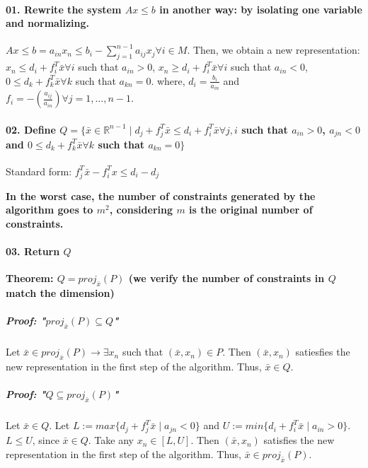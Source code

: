 \documentclass[main]{subfiles}
\begin{document}
\paragraph{01. Rewrite the system $Ax \leq b$ in another way: by isolating one
variable and normalizing.}

$Ax \leq b = a_{i n} x_{n} \leq b_i - \sum_{j = 1}^{n-1} a_{ij}x_j \forall i
\in M$.
Then, we obtain a new representation:
$x_n \leq d_i + f_i^T \bar{x} \forall i$ such that $a_{in} > 0$,
$x_n \geq d_i + f_i^T \bar{x} \forall i $ such that $a_{in} < 0$,
$0 \leq d_k + f_k^T \bar{x} \forall k $ such that $a_{kn} = 0$.
where, $d_i = \frac{b_i}{a_{in}}$ and $f_i = -(\frac{a_{ij}}{a_{in}}) \forall j
= 1, \dots, n-1$.

\paragraph{02. Define $Q = \{\bar{x} \in \mathbb{R}^{n-1} \mid d_j + f_j^T
\bar{x} \leq d_i + f_i^T \bar{x} \forall j, i$ such that $a_{in} > 0$, $a_{jn}
<0$ and $0\leq d_k +f_k^T \bar{x} \forall k$ such that $a_{kn} = 0\}$ }


Standard form: $f_j^T \bar{x} - f_i^T x \leq d_i - d_j$


\textbf{In the worst case, the number of constraints generated by the algorithm
goes to $m^2$, considering $m$ is the original number of constraints.}

\paragraph{03. Return $Q$}


\textbf{Theorem: $Q = proj_{\bar{x}}(P)$ (we verify the number of constraints
in $Q$ match the dimension)}

\subparagraph{Proof: "$proj_{\bar{x}} (P) \subseteq Q$"}
Let $\bar{x} \in proj_{\bar{x}}(P) \rightarrow \exists x_n$ such that
$(\bar{x}, x_n) \in P$. Then $(\bar{x}, x_n)$ satiesfies the new representation
in the first step of the algorithm. Thus, $\bar{x} \in Q$.

\subparagraph{Proof: "$Q \subseteq proj_{\bar{x}}(P)$"}
Let $\bar{x} \in Q$. Let $L:= max \{d_j + f_j^T \bar{x} \mid a_{jn} < 0 \}$ 
and $U:= min \{ d_i + f_i^T \bar{x} \mid a_{in} > 0 \}$.
$L \leq U$, since $\bar{x} \in Q$. Take any $x_n \in [L, U]$. Then $(\bar{x},
x_n)$ satisfies the new representation in the first step of the algorithm.
Thus, $\bar{x} \in proj_{\bar{x}}(P)$.\\
\end{document}
